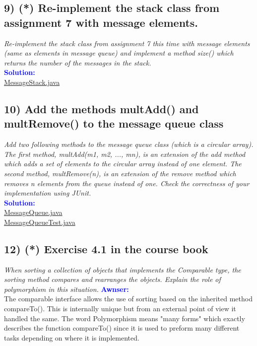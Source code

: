 \documentclass[main.tex]{subfiles}
\begin{document}
\subsection*{9) (*) Re-implement the stack class from assignment 7 with message elements.}
\hypertarget{E9}{ }
\textit{Re-implement the stack class from assignment 7 this time with message elements (same as
elements in message queue) and implement a method size() which returns the number of the messages in the stack.}\\
\indent \textbf{\textcolor{blue}{Solution:}} \\
\hyperlink{MessageStack}{MessageStack.java}


\subsection*{10) Add the methods multAdd() and multRemove() to the message queue class}
\hypertarget{E10}{ }
\textit{Add two following methods to the message queue class (which is a circular array). The first
method, multAdd(m1, m2, ..., mn), is an extension of the add method which adds a set of
elements to the circular array instead of one element. The second method, multRemove(n), is an
extension of the remove method which removes n elements from the queue instead of one. Check
the correctness of your implementation using JUnit.}\\
\indent \textbf{\textcolor{blue}{Solution:}} \\
\hyperlink{MessageQueue}{MessageQueue.java}\\
\hyperlink{MessageQueueTest}{MessageQueueTest.java}


\subsection*{12) (*) Exercise 4.1 in the course book}
\hypertarget{E12}{ }
\textit{When sorting a collection of objects that implements the
Comparable type, the sorting method compares and rearranges the objects. Explain the role of
polymorphism in this situation.}
\indent \textbf{\textcolor{blue}{Awnser:}} \\
    The comparable interface allows the use of sorting based on the inherited method compareTo().
    This is internally unique but from an external point of view it handled the same.
    The word Polymorphism means "many forms" which exactly describes the function compareTo()
    since it is used to preform many different tasks depending on where it is implemented.
\end{document}

